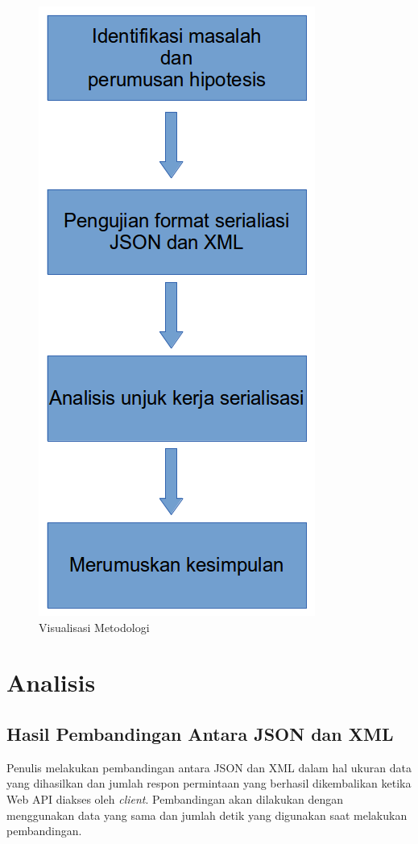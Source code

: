 \documentclass{llncs}
\begin{document}
\onehalfspacing
\begin{figure}[htp]
\centering
\includegraphics[scale=0.45]{images/visualisasi-metodologi.png}
\caption{Visualisasi Metodologi}
\label{visualisasi-metodologi}
\end{figure}

\section{Analisis}

\subsection{Hasil Pembandingan Antara JSON dan XML}

Penulis melakukan pembandingan antara JSON dan XML dalam hal ukuran data yang dihasilkan dan jumlah respon permintaan yang berhasil dikembalikan ketika Web API diakses oleh \textit{client}. Pembandingan akan dilakukan dengan menggunakan data yang sama dan jumlah detik yang digunakan saat melakukan pembandingan.
\end{document}
